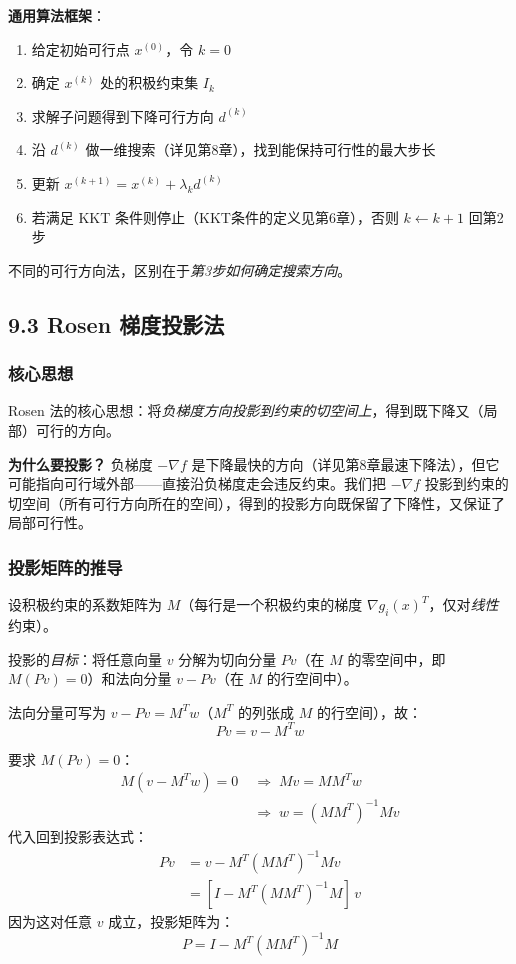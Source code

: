 \textbf{通用算法框架}：
\begin{enumerate}
  \item 给定初始可行点 $x^{(0)}$，令 $k=0$
  \item 确定 $x^{(k)}$ 处的积极约束集 $I_k$
  \item 求解子问题得到下降可行方向 $d^{(k)}$
  \item 沿 $d^{(k)}$ 做一维搜索（详见第8章），找到能保持可行性的最大步长
  \item 更新 $x^{(k+1)} = x^{(k)} + \lambda_k d^{(k)}$
  \item 若满足 KKT 条件则停止（KKT条件的定义见第6章），否则 $k \leftarrow k+1$ 回第2步
\end{enumerate}

不同的可行方向法，区别在于\emph{第3步如何确定搜索方向}。

\subsection{9.3 Rosen 梯度投影法}

\subsubsection{核心思想}

Rosen 法的核心思想：将\emph{负梯度方向投影到约束的切空间上}，得到既下降又（局部）可行的方向。

\textbf{为什么要投影？} 负梯度 $-\nabla f$ 是下降最快的方向（详见第8章最速下降法），但它可能指向可行域外部——直接沿负梯度走会违反约束。我们把 $-\nabla f$ 投影到约束的切空间（所有可行方向所在的空间），得到的投影方向既保留了下降性，又保证了局部可行性。

\subsubsection{投影矩阵的推导}

设积极约束的系数矩阵为 $M$（每行是一个积极约束的梯度 $\nabla g_i(x)^T$，仅对\emph{线性}约束）。

投影的\emph{目标}：将任意向量 $v$ 分解为切向分量 $Pv$（在 $M$ 的零空间中，即 $M(Pv)=0$）和法向分量 $v-Pv$（在 $M$ 的行空间中）。

法向分量可写为 $v-Pv = M^T w$（$M^T$ 的列张成 $M$ 的行空间），故：
\[
Pv = v - M^T w
\]

要求 $M(Pv)=0$：
\begin{align*}
M(v - M^T w) = 0
\;&\Longrightarrow\; Mv = MM^T w \\
&\Longrightarrow\; w = (MM^T)^{-1} Mv
\end{align*}
代入回到投影表达式：
\begin{align*}
Pv &= v - M^T(MM^T)^{-1} Mv \\
   &= [I - M^T(MM^T)^{-1} M]\,v
\end{align*}
因为这对任意 $v$ 成立，投影矩阵为：
\[
\boxed{P = I - M^T (M M^T)^{-1} M}
\]

